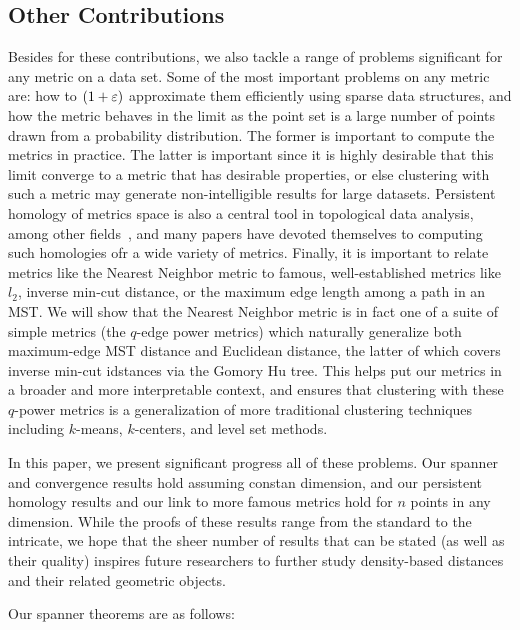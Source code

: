 \subsection{Other Contributions}
Besides for these contributions, we also tackle a range of problems
significant for any metric on a data set.  Some of the most important
problems on any metric are: how to $(1+\varepsilon)$ approximate them efficiently
using sparse data structures, and how the metric behaves in the limit as
the point set is a large number of points drawn from a probability
distribution. The former is important to compute the metrics in practice.
The latter is important since it is highly desirable that
this limit converge to a metric that has desirable properties, or else
clustering with such a metric may generate non-intelligible results for
large datasets.  Persistent homology of metrics space is also a central
tool in topological data analysis, among other fields~\cite{}, and many
papers have devoted themselves to computing such homologies ofr a wide
variety of metrics. Finally, it is important to relate metrics
like the Nearest Neighbor metric to famous, well-established metrics like
$l_2$, inverse min-cut distance, or
the maximum edge length among a path in an MST.
We will show that the
Nearest Neighbor metric is in fact one of a suite of simple metrics (the
$q$-edge power metrics) which naturally generalize both maximum-edge MST
distance and Euclidean distance, the latter of which covers inverse min-cut
idstances via the Gomory Hu tree.  This helps put our metrics in a broader
and more interpretable context, and ensures that clustering with these
$q$-power metrics is a generalization of more traditional clustering
techniques including $k$-means, $k$-centers, and level set methods.

In this paper, we present significant progress all of these problems. Our
spanner and convergence results hold assuming constan dimension, and our
persistent homology results and our link to more famous metrics hold for
$n$ points in any dimension. While the proofs of these results range from
the standard to the intricate, we hope that the sheer number of results
that can be stated (as well as their quality) inspires future researchers
to further study density-based distances and their related geometric objects.

Our spanner theorems are as follows:

 

